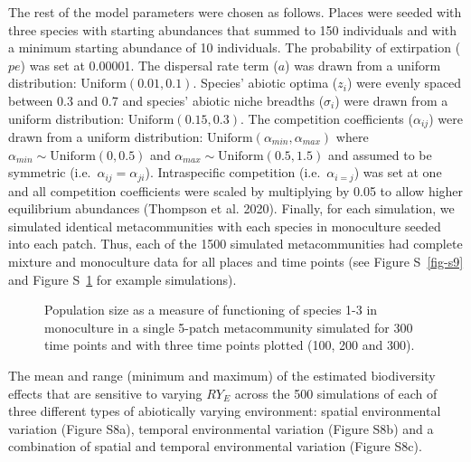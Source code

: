 \documentclass[
  letterpaper,
  DIV=11,
  numbers=noendperiod]{scrartcl}
\begin{document}
The rest of the model parameters were chosen as follows. Places were
seeded with three species with starting abundances that summed to 150
individuals and with a minimum starting abundance of 10 individuals. The
probability of extirpation (\(pe\)) was set at 0.00001. The dispersal
rate term (\(a\)) was drawn from a uniform distribution:
\(\text{Uniform}(0.01, 0.1)\). Species' abiotic optima (\(z_i\)) were
evenly spaced between 0.3 and 0.7 and species' abiotic niche breadths
(\(\sigma_i\)) were drawn from a uniform distribution:
\(\text{Uniform}(0.15, 0.3)\). The competition coefficients
(\(\alpha_{ij}\)) were drawn from a uniform distribution:
\(\text{Uniform}(\alpha_{min}, \alpha_{max})\) where
\(\alpha_{min} \sim \text{Uniform}(0, 0.5)\) and
\(\alpha_{max} \sim \text{Uniform}(0.5, 1.5)\) and assumed to be
symmetric (i.e.~\(\alpha_{ij} = \alpha_{ji}\)). Intraspecific
competition (i.e.~\(\alpha_{i = j}\)) was set at one and all competition
coefficients were scaled by multiplying by 0.05 to allow higher
equilibrium abundances (Thompson et al. 2020). Finally, for each
simulation, we simulated identical metacommunities with each species in
monoculture seeded into each patch. Thus, each of the 1500 simulated
metacommunities had complete mixture and monoculture data for all places
and time points (see Figure S~\ref{fig-s9} and Figure S~\ref{fig-s10}
for example simulations).

\begin{figure}


\caption{\label{fig-s10}Population size as a measure of functioning of
species 1-3 in monoculture in a single 5-patch metacommunity simulated
for 300 time points and with three time points plotted (100, 200 and
300).}

\end{figure}%

\begin{table}

\caption{\label{tbl-s6}The mean and range (minimum and maximum) of the
estimated biodiversity effects that are sensitive to varying \(RY_E\)
across the 500 simulations of each of three different types of
abiotically varying environment: spatial environmental variation (Figure
S8a), temporal environmental variation (Figure S8b) and a combination of
spatial and temporal environmental variation (Figure S8c).}


\end{table}%
\end{document}
